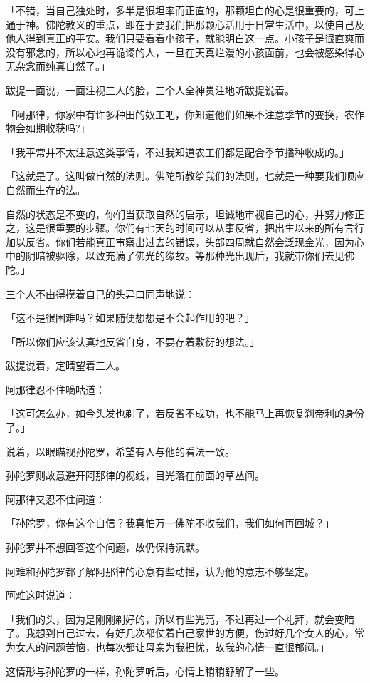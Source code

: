 \documentclass[twoside,openany]{book}
\begin{document}
「不错，当自己独处时，多半是很坦率而正直的，那颗坦白的心是很重要的，可上通于神。佛陀教义的重点，即在于要我们把那颗心活用于日常生活中，以使自己及他人得到真正的平安。我们只要看看小孩子，就能明白这一点。小孩子是很直爽而没有邪念的，所以心地再诡谲的人，一旦在天真烂漫的小孩面前，也会被感染得心无杂念而纯真自然了。」

跋提一面说，一面注视三人的脸，三个人全神贯注地听跋提说着。

「阿那律，你家中有许多种田的奴工吧，你知道他们如果不注意季节的变换，农作物会如期收获吗?」

「我平常并不太注意这类事情，不过我知道农工们都是配合季节播种收成的。」

「这就是了。这叫做自然的法则。佛陀所教给我们的法则，也就是一种要我们顺应自然而生存的法。

自然的状态是不变的，你们当获取自然的启示，坦诚地审视自己的心，并努力修正之，这是很重要的步骤。你们有七天的时间可以从事反省，把出生以来的所有言行加以反省。你们若能真正审察出过去的错误，头部四周就自然会泛现金光，因为心中的阴暗被驱除，以致充满了佛光的缘故。等那种光出现后，我就带你们去见佛陀。」

三个人不由得摸着自己的头异口同声地说：

「这不是很困难吗？如果随便想想是不会起作用的吧？」

「所以你们应该认真地反省自身，不要存着敷衍的想法。」

跋提说着，定睛望着三人。

阿那律忍不住嘀咕道：

「这可怎么办，如今头发也剃了，若反省不成功，也不能马上再恢复刹帝利的身份了。」

说着，以眼瞄视孙陀罗，希望有人与他的看法一致。

孙陀罗则故意避开阿那律的视线，目光落在前面的草丛间。

阿那律又忍不住问道：

「孙陀罗，你有这个自信？我真怕万一佛陀不收我们，我们如何再回城？」

孙陀罗并不想回答这个问题，故仍保持沉默。

阿难和孙陀罗都了解阿那律的心意有些动摇，认为他的意志不够坚定。

阿难这时说道：

「我们的头，因为是刚刚剃好的，所以有些光亮，不过再过一个礼拜，就会变暗了。我想到自己过去，有好几次都仗着自己家世的方便，伤过好几个女人的心，常为女人的问题苦恼，也每次都让母亲为我担忧，故我的心情一直很郁闷。」

这情形与孙陀罗的一样，孙陀罗听后，心情上稍稍舒解了一些。
\end{document}

